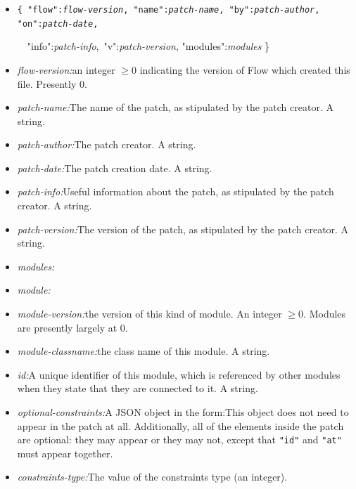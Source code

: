 \documentclass{article}
\begin{document}
\begin{itemize}
\item {\tt \{  "flow":{\it flow-version}, "name":{\it patch-name}, "by":{\it patch-author}, "on":{\it patch-date}, \rule[0in]{0in}{0in}~\hspace{\fill}\hbox{ "info":{\it patch-info}, "v":{\it patch-version},}  "modules":{\it modules} \} }
\item {\it flow-version:}\quad an integer \(\geq 0\) indicating the version of Flow which created this file.  Presently 0. 
\item {\it patch-name:}\quad The name of the patch, as stipulated by the patch creator.  A string. 
\item {\it patch-author:}\quad The patch creator.  A string.  
\item {\it patch-date:}\quad The patch creation date.  A string.  
\item {\it patch-info:}\quad Useful information about the patch, as stipulated by the patch creator.  A string.  
\item {\it patch-version:}\quad The version of the patch, as stipulated by the patch creator.  A string. 
\item {\it modules:}\quad {\tt [ {\it module,*} ] }
\item {\it module:}
\item {\it module-version:}\quad the version of this kind of module.  An integer \(\geq 0\).  Modules are presently largely at 0.
\item {\it module-classname:}\quad the class name of this module.  A string.
\item {\it id:}\quad A unique identifier of this module, which is referenced by other modules when they state that they are connected to it.  A string.
\item {\it optional-constraints:}\quad A JSON object in the form:\quad  This object does not need to appear in the patch at all.  Additionally, all of the elements inside the patch are optional: they may appear or they may not, except that {\tt "id"} and {\tt "at"} must appear together.
\item {\it constraints-type:}\quad The value of the constraints type (an integer).

\end{itemize}
\end{document}
